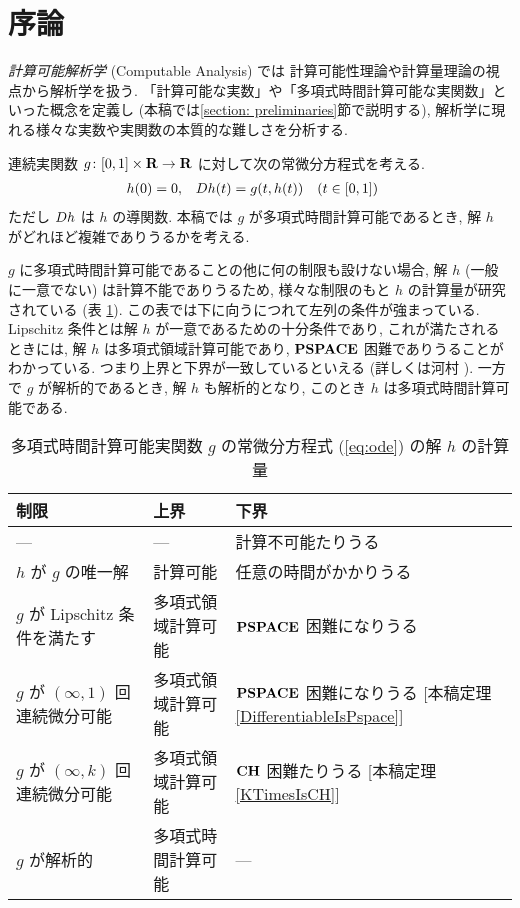 \section{序論}

\emph{計算可能解析学} (Computable Analysis) \cite{weihrauch00:_comput_analy} では
計算可能性理論や計算量理論の視点から解析学を扱う. 
「計算可能な実数」や「多項式時間計算可能な実関数」といった概念を定義し
(本稿では\ref{section: preliminaries}節で説明する), 
解析学に現れる様々な実数や実関数の本質的な難しさを分析する. 

連続実関数 $g \colon [0,1] \times \mathbf R \to \mathbf R$ に対して次の常微分方程式を考える. 
\begin{align}
 \label{eq:ode}
 h(0) & = 0, &
 D h(t) & = g(t,h(t)) \quad (t \in [0,1])
\end{align}
ただし $D h$ は $h$ の導関数.
本稿では $g$ が多項式時間計算可能であるとき, 
解 $h$ がどれほど複雑でありうるかを考える.

$g$ に多項式時間計算可能であることの他に何の制限も設けない場合, 
解 $h$ (一般に一意でない) は計算不能でありうるため,
様々な制限のもと $h$ の計算量が研究されている (表 \ref{table:related}).
この表では下に向うにつれて左列の条件が強まっている. 
Lipschitz 条件とは解 $h$ が一意であるための十分条件であり, 
これが満たされるときには, 解 $h$ は多項式領域計算可能であり, 
$\mathbf{PSPACE}$ 困難でありうることがわかっている. 
つまり上界と下界が一致しているといえる (詳しくは河村 \cite{kawamura2010lipschitz}).
一方で $g$ が解析的であるとき, 解 $h$ も解析的となり, 
このとき $h$ は多項式時間計算可能である.


\begin{table}
\renewcommand\arraystretch{1.3}
\begin{center}
 \caption{多項式時間計算可能実関数 $g$ の常微分方程式 (\ref{eq:ode}) の解 $h$ の計算量}
 \label{table:related}
 \begin{tabular}{lll}
  制限 & 上界 & 下界 \\
  \hline
   --- & --- & 計算不可能たりうる \cite{pour1979computable} \\
  $h$ が $g$ の唯一解 & 計算可能 \cite{coddington1955theory}
  & 任意の時間がかかりうる \cite{ko1983computational, miller1970recursive} \\
  $g$ が Lipschitz 条件を満たす & 多項式領域計算可能 \cite{ko1983computational}
      &	$\mathbf{PSPACE}$ 困難になりうる \cite{kawamura2010lipschitz}\\
  $g$ が $(\infty, 1)$ 回連続微分可能 & 多項式領域計算可能 & \parbox[t]{14zw}{$\mathbf{PSPACE}$ 困難になりうる\\{}[本稿定理\ref{DifferentiableIsPspace}]} \\
  $g$ が $(\infty, k)$ 回連続微分可能 & 多項式領域計算可能 & \parbox[t]{14zw}{$\mathbf{CH}$ 困難たりうる\\{}[本稿定理\ref{KTimesIsCH}]} \\
  $g$ が解析的 
  & 多項式時間計算可能 \cite{ko1988computing, kawamura2010complexity} 
  & ---
 \end{tabular}
\end{center}
\end{table}

